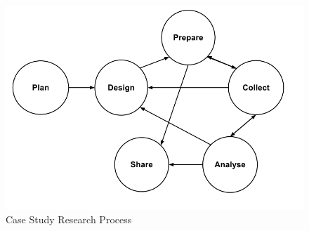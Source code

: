 \begin{figure}[h]
\begin{center}
\includegraphics[scale=0.38]{caseProcess.png}
\caption[Case Study Research Process]{Case Study Research Process \cite{CaseStudyResearch}}
\label{fig:caseProcess}
\end{center}
\end{figure}



